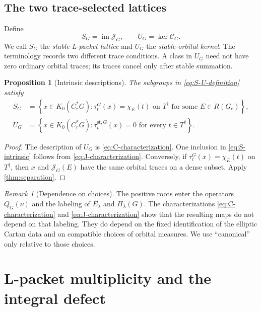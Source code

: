 \documentclass[11pt]{amsart}
\newtheorem{proposition}[theorem]{Proposition}
\theoremstyle{definition}
\theoremstyle{remark}
\newtheorem{remark}[theorem]{Remark}
\newcommand{\Cr}{C_r^*}
\newcommand{\st}{\mathrm{st}}
\newcommand{\im}{\operatorname{im}}
\begin{document}
\subsection{The two trace-selected lattices}

Define
\begin{equation}\label{eq:S-U-definition}
  S_G=\im\mathcal J_G,
  \qquad
  U_G=\ker\mathcal C_G.
\end{equation}
We call $S_G$ the \emph{stable L-packet lattice} and $U_G$ the \emph{stable-orbital kernel}.  The terminology records two different trace conditions.  A class in $U_G$ need not have zero ordinary orbital traces; its traces cancel only after stable summation.

\begin{proposition}[Intrinsic descriptions]\label{prop:intrinsic}
The subgroups in \eqref{eq:S-U-definition} satisfy
\begin{align}
  S_G
  &=\left\{x\in K_0(\Cr G):
      \tau_t^G(x)=\chi_E(t)\text{ on }T^\dagger
      \text{ for some }E\in R(G_c)\right\},\label{eq:S-intrinsic}\\
  U_G
  &=\left\{x\in K_0(\Cr G):
      \tau_t^{\st,G}(x)=0\text{ for every }t\in T^\dagger\right\}.
      \label{eq:U-intrinsic}
\end{align}
\end{proposition}

\begin{proof}
The description of $U_G$ is \eqref{eq:C-characterization}.  One inclusion in \eqref{eq:S-intrinsic} follows from \eqref{eq:J-characterization}.  Conversely, if $\tau_t^G(x)=\chi_E(t)$ on $T^\dagger$, then $x$ and $\mathcal J_G(E)$ have the same orbital traces on a dense subset.  Apply \cref{thm:separation}.
\end{proof}

\begin{remark}[Dependence on choices]\label{rem:choices}
The positive roots enter the operators $Q_G(\nu)$ and the labeling of $E_\lambda$ and $\Pi_\lambda(G)$.  The characterizations \eqref{eq:C-characterization} and \eqref{eq:J-characterization} show that the resulting maps do not depend on that labeling.  They do depend on the fixed identification of the elliptic Cartan data and on compatible choices of orbital measures.  We use ``canonical'' only relative to those choices.
\end{remark}

\section{L-packet multiplicity and the integral defect}\label{sec:defect}
\end{document}
